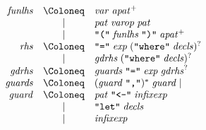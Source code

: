 \begin{align*}
  \begin{array}{rcl}
    \mathit{funlhs}
    & \Coloneq & \mathit{var}\; \mathit{apat}^+ \\
    & \mid & \mathit{pat}\; \mathit{varop}\; \mathit{pat} \\
    & \mid & \text{\texttt{\textquotedbl(\textquotedbl}}\; \mathit{funlhs}\; \text{\texttt{\textquotedbl)\textquotedbl}}\; \mathit{apat}^+ \\
    \mathit{rhs}
    & \Coloneq & \text{\texttt{\textquotedbl =\textquotedbl}}\; \mathit{exp}\; (\text{\texttt{\textquotedbl where\textquotedbl}}\; \mathit{decls})^? \\
    & \mid & \mathit{gdrhs}\; (\text{\texttt{\textquotedbl where\textquotedbl}}\; \mathit{decls})^? \\
    \mathit{gdrhs}
    & \Coloneq & \mathit{guards}\; \text{\texttt{\textquotedbl =\textquotedbl}}\; \mathit{exp}\; \mathit{gdrhs}^? \\
    \mathit{guards}
    & \Coloneq & (\mathit{guard}\; \text{\texttt{\textquotedbl ,\textquotedbl}})^*\; \mathit{guard} \mid \\
    \mathit{guard}
    & \Coloneq & \mathit{pat}\; \text{\texttt{\textquotedbl <-\textquotedbl}}\; \mathit{infixexp} \\
    & \mid & \text{\texttt{\textquotedbl let\textquotedbl}}\; \mathit{decls} \\
    & \mid & \mathit{infixexp}
  \end{array}
\end{align*}

